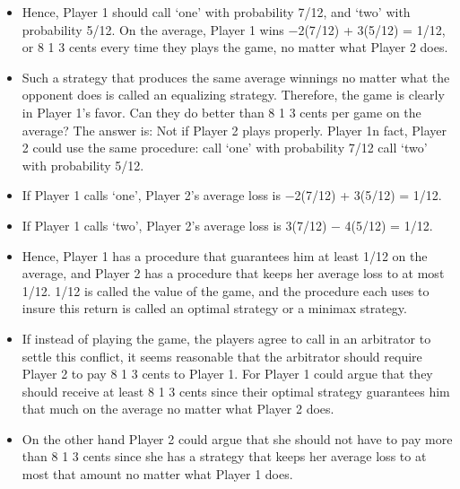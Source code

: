 \begin{itemize}
\item Hence, Player 1 should call ‘one’ with probability 7/12, and ‘two’ with probability 5/12. On the
average, Player 1 wins −2(7/12) + 3(5/12) = 1/12, or 8 1
3 cents every time they plays the game, no
matter what Player 2 does. 
\item Such a strategy that produces the same average winnings no matter
what the opponent does is called an equalizing strategy.
Therefore, the game is clearly in Player 1’s favor. Can they do better than 8 1
3 cents per game
on the average? The answer is: Not if Player 2 plays properly. Player 1n fact, Player 2 could use the same
procedure:
call ‘one’ with probability 7/12
call ‘two’ with probability 5/12.
\item If Player 1 calls ‘one’, Player 2’s average loss is −2(7/12) + 3(5/12) = 1/12. 
\item If Player 1 calls ‘two’, Player 2’s average
loss is 3(7/12) − 4(5/12) = 1/12.
\item Hence, Player 1 has a procedure that guarantees him at least 1/12 on the average, and Player 2 has
a procedure that keeps her average loss to at most 1/12. 1/12 is called the value of the
game, and the procedure each uses to insure this return is called an optimal strategy or
a minimax strategy.
\item If instead of playing the game, the players agree to call in an arbitrator to settle this
conflict, it seems reasonable that the arbitrator should require Player 2 to pay 8 1
3 cents to Player 1. For
Player 1 could argue that they should receive at least 8 1
3 cents since their optimal strategy guarantees
him that much on the average no matter what Player 2 does. 
\item On the other hand Player 2 could argue
that she should not have to pay more than 8 1
3 cents since she has a strategy that keeps
her average loss to at most that amount no matter what Player 1 does.
\end{itemize}
